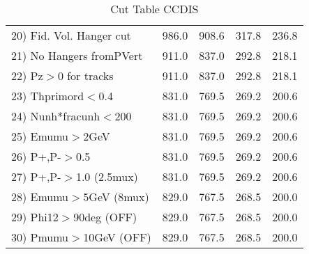 \begin{table}[h!]
\begin{tabular}{||l||r|r|r|r||}
 20) Fid. Vol. Hanger cut &       986.0 &       908.6 &       317.8 &       236.8 \\
 21) No Hangers fromPVert &       911.0 &       837.0 &       292.8 &       218.1 \\
 22) Pz$>$0 for tracks    &       911.0 &       837.0 &       292.8 &       218.1 \\
 23) Thprimord$<$0.4      &       831.0 &       769.5 &       269.2 &       200.6 \\
 24) Nunh*fracunh$<$200   &       831.0 &       769.5 &       269.2 &       200.6 \\
 25) Emumu$>$2GeV         &       831.0 &       769.5 &       269.2 &       200.6 \\
 26) P+,P-$>$0.5          &       831.0 &       769.5 &       269.2 &       200.6 \\
 27) P+,P-$>$1.0 (2.5mux) &       831.0 &       769.5 &       269.2 &       200.6 \\
 28) Emumu$>$5GeV  (8mux) &       829.0 &       767.5 &       268.5 &       200.0 \\
 29) Phi12$>$90deg  (OFF) &       829.0 &       767.5 &       268.5 &       200.0 \\
 30) Pmumu$>$10GeV  (OFF) &       829.0 &       767.5 &       268.5 &       200.0 \\
 \hline
 \hline
 \end{tabular}
 \caption{Cut Table  CCDIS  }
 \label{tab-cut_ccdis}
 \end{table}
